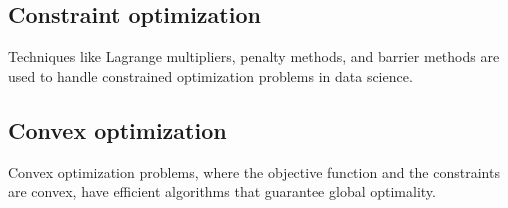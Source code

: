 \subsection{Constraint optimization}

Techniques like Lagrange multipliers, penalty methods, and barrier methods are used to
handle constrained optimization problems in data science.

\subsection{Convex optimization}

Convex optimization problems, where the objective function and the constraints are convex,
have efficient algorithms that guarantee global optimality.

%
%
%
%
%
%
%
